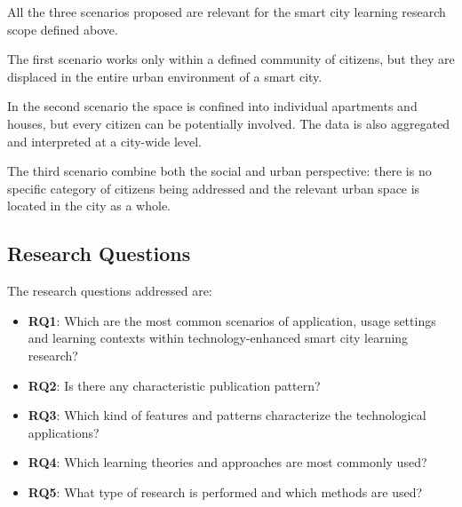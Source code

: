 All the three scenarios proposed are relevant for the smart city learning research scope defined above.

The first scenario works only within a defined community of citizens, but they are displaced in the entire urban environment of a smart city.

In the second scenario the space is confined into individual apartments and houses, but every citizen can be potentially involved. The data is also aggregated and interpreted at a city-wide level.

The third scenario combine both the social and urban perspective: there is no specific category of citizens being addressed and the relevant urban space is located in the city as a whole.


\subsection{Research Questions}
The research questions addressed are:

\begin{itemize}
\item \textbf{RQ1}: Which are the most common scenarios of application, usage settings and learning contexts within technology-enhanced smart city learning research?
\item \textbf{RQ2}: Is there any characteristic publication pattern?
\item \textbf{RQ3}: Which kind of features and patterns characterize the technological applications?
\item \textbf{RQ4}: Which learning theories and approaches are most commonly used?
\item \textbf{RQ5}: What type of research is performed and which methods are used?
\end{itemize}

